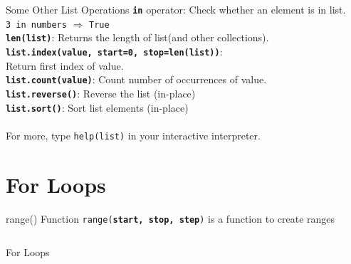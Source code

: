         \begin{frame}{Some Other List Operations}
            \Large
            \textbf{\texttt{in}} operator: Check whether an element is in list.\\
            \texttt{3 in numbers} $\Rightarrow$ \texttt{True}\\
            \textbf{\texttt{len(list)}}: Returns the length of list(and other collections).\\
            \textbf{\texttt{list.index(value, start=0, stop=len(list))}}:\\
            Return first index of value.\\
            \textbf{\texttt{list.count(value)}}: Count number of occurrences of value.\\
            \textbf{\texttt{list.reverse()}}: Reverse the list (in-place)\\
            \textbf{\texttt{list.sort()}}: Sort list elements (in-place)\\
            \\ 
            For more, type \texttt{help(list)} in your interactive interpreter.
        \end{frame}


    \section{For Loops}
      
        \begin{frame}{range() Function}
            \pause
            \LARGE
            \texttt{range(\textbf{start, stop, step})} is a function to create ranges
            \bigskip
            \inputminted[frame=single,framesep=2pt]{python3}{code-examples/range.py}
        \end{frame}
      
        \begin{frame}{For Loops}
            \pause
            \begin{columns}
                \begin{column}{0.5\textwidth}
                    \inputminted[frame=single,framesep=2pt]{python3}{code-examples/for1.py}
                \end{column}
               \pause 
                \begin{column}{0.5\textwidth}
                    \inputminted[frame=single,framesep=2pt]{python3}{code-examples/for2.py}
                    \pause
                    \inputminted[frame=single,framesep=2pt]{python3}{code-examples/for3.py}
                    \pause
                    \inputminted[frame=single,framesep=2pt]{python3}{code-examples/for4.py}
                \end{column} 
            \end{columns}
        \end{frame}
        
